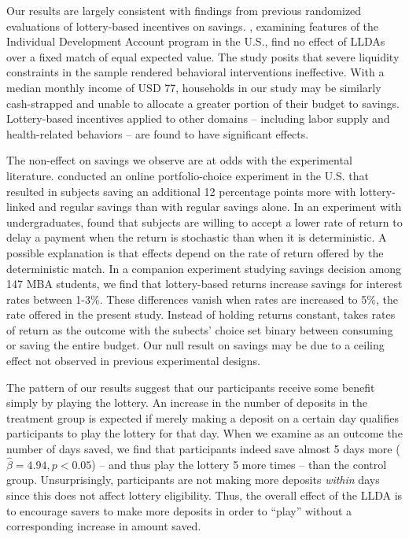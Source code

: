 \documentclass[12pt]{article}
\begin{document}
		Our results are largely consistent with findings from previous randomized evaluations of lottery-based incentives on savings. , examining features of the Individual Development Account program in the U.S., find no effect of LLDAs over a fixed match of equal expected value. The study posits that severe liquidity constraints in the sample rendered behavioral interventions ineffective. With a median monthly income of USD 77, households in our study may be similarly cash-strapped and unable to allocate a greater portion of their budget to savings. Lottery-based incentives applied to other domains -- including labor supply  and health-related behaviors  -- are found to have significant effects.


		The non-effect on savings we observe are at odds with the experimental literature.  conducted an online portfolio-choice experiment in the U.S. that resulted in subjects saving an additional 12 percentage points more with lottery-linked and regular savings than with regular savings alone. In an experiment with undergraduates,  found that subjects are willing to accept a lower rate of return to delay a payment when the return is stochastic than when it is deterministic. A possible explanation is that effects depend on the rate of return offered by the deterministic match. In a companion experiment studying savings decision among 147 MBA students, we find that lottery-based returns increase savings for interest rates between 1-3\%. These differences vanish when rates are increased to 5\%, the rate offered in the present study. Instead of holding returns constant,  takes rates of return as the outcome with the subects' choice set binary between consuming or saving the entire budget. Our null result on savings may be due to a ceiling effect not observed in previous experimental designs.

		The pattern of our results suggest that our participants receive some benefit simply by playing the lottery. An increase in the number of deposits in the treatment group is expected if merely making a deposit on a certain day qualifies participants to play the lottery for that day. When we examine as an outcome the number of days saved, we find that participants indeed save almost 5 days more ($\hat \beta = 4.94, p < 0.05$) -- and thus play the lottery 5 more times -- than the control group. Unsurprisingly, participants are not making more deposits \textit{within} days since this does not affect lottery eligibility. Thus, the overall effect of the LLDA is to encourage savers to make more deposits in order to ``play'' without a corresponding increase in amount saved. %
\end{document}
